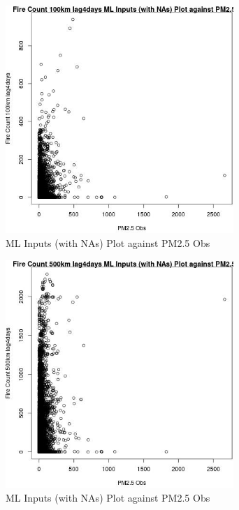 \begin{figure} 
\centering  
\includegraphics[width=0.77\textwidth]{Code_Outputs/Report_ML_input_PM25_Step4_part_e_de_duplicated_aves_compiled_2019-05-20wNAs_Fire_Count_100km_lag4daysvPM25_Obs.jpg} 
\caption{\label{fig:Report_ML_input_PM25_Step4_part_e_de_duplicated_aves_compiled_2019-05-20wNAsFire_Count_100km_lag4daysvPM25_Obs}ML Inputs (with NAs) Plot against PM2.5 Obs} 
\end{figure} 
 

\clearpage 

\begin{figure} 
\centering  
\includegraphics[width=0.77\textwidth]{Code_Outputs/Report_ML_input_PM25_Step4_part_e_de_duplicated_aves_compiled_2019-05-20wNAs_Fire_Count_500km_lag4daysvPM25_Obs.jpg} 
\caption{\label{fig:Report_ML_input_PM25_Step4_part_e_de_duplicated_aves_compiled_2019-05-20wNAsFire_Count_500km_lag4daysvPM25_Obs}ML Inputs (with NAs) Plot against PM2.5 Obs} 
\end{figure} 
 

